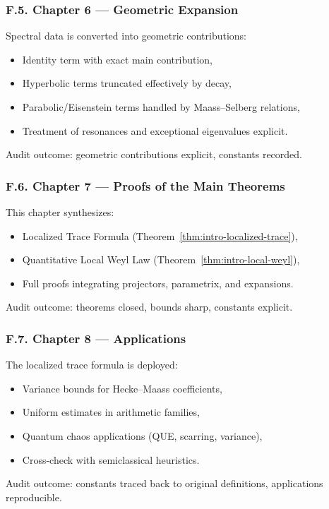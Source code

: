\subsubsection*{F.5. Chapter 6 — Geometric Expansion}
Spectral data is converted into geometric contributions:
\begin{itemize}
  \item Identity term with exact main contribution,
  \item Hyperbolic terms truncated effectively by decay,
  \item Parabolic/Eisenstein terms handled by Maass–Selberg relations,
  \item Treatment of resonances and exceptional eigenvalues explicit.
\end{itemize}
Audit outcome: geometric contributions explicit, constants recorded.

\subsubsection*{F.6. Chapter 7 — Proofs of the Main Theorems}
This chapter synthesizes:
\begin{itemize}
  \item Localized Trace Formula (Theorem~\ref{thm:intro-localized-trace}),
  \item Quantitative Local Weyl Law (Theorem~\ref{thm:intro-local-weyl}),
  \item Full proofs integrating projectors, parametrix, and expansions.
\end{itemize}
Audit outcome: theorems closed, bounds sharp, constants explicit.

\subsubsection*{F.7. Chapter 8 — Applications}
The localized trace formula is deployed:
\begin{itemize}
  \item Variance bounds for Hecke–Maass coefficients,
  \item Uniform estimates in arithmetic families,
  \item Quantum chaos applications (QUE, scarring, variance),
  \item Cross-check with semiclassical heuristics.
\end{itemize}
Audit outcome: constants traced back to original definitions,
applications reproducible.

